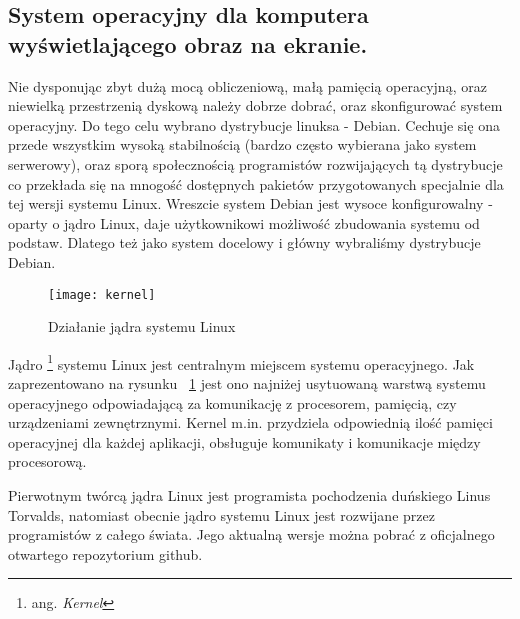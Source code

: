 \subsection{System operacyjny dla komputera wyświetlającego obraz na ekranie.}

Nie dysponując zbyt dużą mocą obliczeniową, małą pamięcią operacyjną, oraz niewielką przestrzenią dyskową należy dobrze dobrać, oraz skonfigurować system operacyjny. Do tego celu wybrano dystrybucje linuksa - Debian. Cechuje się ona przede wszystkim wysoką stabilnością (bardzo często wybierana jako system serwerowy), oraz sporą społecznością programistów rozwijających tą dystrybucje co przekłada się na mnogość dostępnych pakietów przygotowanych specjalnie dla tej wersji systemu Linux. Wreszcie system Debian jest wysoce konfigurowalny - oparty o jądro Linux, daje użytkownikowi możliwość zbudowania systemu od podstaw. Dlatego też jako system docelowy i główny wybraliśmy dystrybucje Debian.

\begin{figure}
\begin{center}
    \texttt{[image: kernel]}
\end{center}
\caption{Działanie jądra systemu Linux}
\label{fig:kernel}
\end{figure}

Jądro \footnote{ang. \emph{Kernel}} systemu Linux jest centralnym miejscem systemu operacyjnego. Jak zaprezentowano na rysunku ~\ref{fig:kernel} jest ono najniżej usytuowaną warstwą systemu operacyjnego odpowiadającą za komunikację z procesorem, pamięcią, czy urządzeniami zewnętrznymi. Kernel m.in. przydziela odpowiednią ilość pamięci operacyjnej dla każdej aplikacji, obsługuje komunikaty i komunikacje między procesorową.

Pierwotnym twórcą jądra Linux jest programista pochodzenia duńskiego Linus Torvalds, natomiast obecnie jądro systemu Linux jest rozwijane przez programistów z całego świata. Jego aktualną wersje można pobrać z oficjalnego otwartego repozytorium github.


\par






